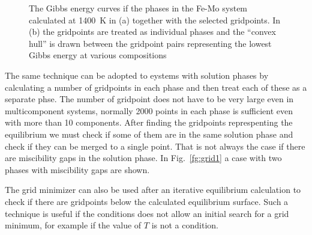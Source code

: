 \documentclass[12pt]{article}
\begin{document}
\begin{figure}
\caption{The Gibbs energy curves if the phases in the Fe-Mo system
calculated at 1400~K in (a) together with the selected gridpoints.  In
(b) the gridpoints are treated as individual phases and the ``convex
hull'' is drawn between the gridpoint pairs representing the lowest
Gibbs energy at various compositions}\label{fg:femogrid}
\end{figure}

The same technique can be adopted to eystems with solution phases by
calculating a number of gridpoints in each phase and then treat each
of these as a separate phse.  The number of gridpoint does not have to
be very large even in multicomponent systems, normally 2000 points in
each phase is sufficient even with more than 10 components.  After
finding the gridpoints represpenting the equilibrium we must check if
some of them are in the same solution phase and check if they can be
merged to a single point.  That is not always the case if there are
miscibility gaps in the solution phase.  In Fig.~\ref{fg:grid1} a
case with two phases with miscibility gaps are shown.

The grid minimizer can also be used after an iterative equilibrium
calculation to check if there are gridpoints below the calculated
equilibrium surface.  Such a technique is useful if the conditions
does not allow an initial search for a grid minimum, for example if
the value of $T$ is not a condition.
\end{document}
